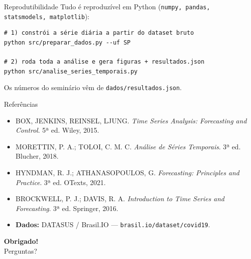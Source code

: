 \documentclass[aspectratio=169,11pt]{beamer}
\begin{document}
\begin{frame}[fragile]{Reprodutibilidade}
  Tudo é reproduzível em Python (\texttt{numpy, pandas, statsmodels, matplotlib}):
  \begin{tcolorbox}[enhanced,colback=black,opacityback=0.55,colframe=pitchred,
       boxrule=1pt,arc=2mm,coltext=white,fontupper=\ttfamily\footnotesize]
\begin{verbatim}
# 1) constrói a série diária a partir do dataset bruto
python src/preparar_dados.py --uf SP

# 2) roda toda a análise e gera figuras + resultados.json
python src/analise_series_temporais.py
\end{verbatim}
  \end{tcolorbox}
  \centering\footnotesize\color{clight}
  Os números do seminário vêm de \texttt{dados/resultados.json}.
\end{frame}

\begin{frame}{Referências}
  \footnotesize
  \begin{itemize}\footnotesize
    \item BOX, JENKINS, REINSEL, LJUNG. \textit{Time Series Analysis: Forecasting and Control}. 5ª ed. Wiley, 2015.
    \item MORETTIN, P. A.; TOLOI, C. M. C. \textit{Análise de Séries Temporais}. 3ª ed. Blucher, 2018.
    \item HYNDMAN, R. J.; ATHANASOPOULOS, G. \textit{Forecasting: Principles and Practice}. 3ª ed. OTexts, 2021.
    \item BROCKWELL, P. J.; DAVIS, R. A. \textit{Introduction to Time Series and Forecasting}. 3ª ed. Springer, 2016.
    \item \textbf{Dados:} DATASUS / Brasil.IO — \texttt{brasil.io/dataset/covid19}.
  \end{itemize}
\end{frame}

\begin{frame}[plain]
  \centering\vfill
  \begin{tcolorbox}[enhanced,colback=white,opacityback=0.10,colframe=pitchred,
      boxrule=1.5pt,arc=5mm,width=0.6\paperwidth,halign=center,top=5mm,bottom=5mm]
    {\ttfamily\bfseries\Huge\color{white}Obrigado!}\\[0.6em]
    {\large\color{clight}Perguntas?}
  \end{tcolorbox}
  \vfill
\end{frame}
\end{document}
